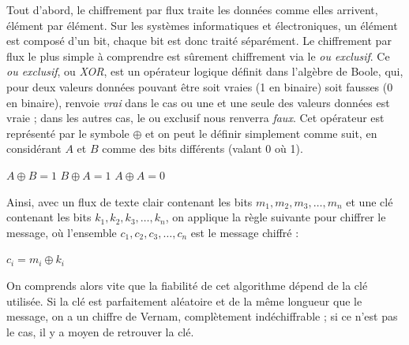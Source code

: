 \label{syst:XOR}
Tout d'abord, le chiffrement par flux traite les données comme elles
arrivent, élément par élément. Sur les systèmes informatiques et
électroniques, un élément est composé d'un bit, chaque bit est donc
traité séparément. Le chiffrement par flux le plus simple à comprendre
est sûrement chiffrement via le \emph{ou exclusif}. Ce \emph{ou
  exclusif}, ou \emph{XOR}, est un opérateur logique définit dans
l'algèbre de Boole, qui, pour deux valeurs données pouvant être soit
vraies (1 en binaire) soit fausses (0 en binaire), renvoie \emph{vrai}
dans le cas ou une et une seule des valeurs données est vraie ; dans
les autres cas, le ou exclusif nous renverra \emph{faux}. Cet
opérateur est représenté par le symbole $\oplus$ et on peut le définir
simplement comme suit, en considérant $A$ et $B$ comme des bits
différents (valant 0
où 1).
\begin{center}
  $A \oplus B = 1$ \hspace{1.5cm} $B \oplus A = 1$ \hspace{1.5cm} $A
\oplus A = 0$ 
\end{center} 

Ainsi, avec un flux de texte clair contenant les bits $m_1,
m_2, m_3, \dots, m_n$ et une clé contenant les bits $k_1, k_2, k_3,
\dots, k_n$, on applique la règle suivante pour chiffrer le message,
où l'ensemble $c_1, c_2, c_3, \dots, c_n$ est le message chiffré :
\begin{center}
$c_i = m_i \oplus k_i$
\end{center}

On comprends alors vite que la fiabilité de cet algorithme dépend de
la clé utilisée. Si la clé est parfaitement aléatoire et de la
même longueur que le message, on a un chiffre de Vernam, complètement
indéchiffrable ; si ce n'est pas le cas, il y a moyen de retrouver la
clé.



